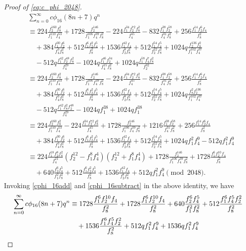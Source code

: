 \documentclass[12pt]{article}
\numberwithin{equation}{section}
\theoremstyle{plain}
\numberwithin{theorem}{section}
\theoremstyle{definition}
\theoremstyle{remark}
\begin{document}
\begin{proof}[Proof of \eqref{eq:c_phi_2048}]
\begin{align*}
			&\sum_{n=0}^{\infty}c\phi_{16}(8n+7)q^n\\&\equiv224\frac{f_2^{160}f_8^2}{f_1^{110} f_4^{53}}+1728\frac{f_2^{146}}{f_1^{106} f_4^{39} f_8^2}-224\frac{f_1^{34}f_2^{72} f_8^2 }{f_4^{45}}-832\frac{f_1^{38} f_2^{58}}{f_4^{31} f_8^2}+256\frac{f_1^{14} f_2^6 f_4}{f_8^2}\\&\quad+384\frac{f_1^{30} f_2^6}{f_4^3 f_8^2}+512\frac{f_1^6 f_2^2 f_4^5}{f_8^2}+1536\frac{f_1^{42} f_4}{f_2^8 f_8^2}+512\frac{f_1^{54} f_4^5}{f_2^{22} f_8^2}+1024q\frac{f_2^{136} f_8^2}{f_1^{102} f_4^{37}}\\&\quad-512q\frac{f_1^{42} f_2^{48} f_8^2}{f_4^{29}}-1024q\frac{f_1^{46} f_2^{34}}{f_4^{15} f_8^2}+1024q\frac{f_1^{58} f_4^7 f_8^2}{f_2^{32}}\\
            &\equiv224\frac{f_2^{160}f_8^2}{f_1^{110} f_4^{53}}+1728\frac{f_2^{146}}{f_1^{106} f_4^{39} f_8^2}-224\frac{f_1^{34} f_2^{72} f_8^2}{f_4^{45}}-832\frac{f_1^{38} f_2^{58}}{f_4^{31} f_8^2}+256\frac{f_1^{14} f_2^6 f_4}{f_8^2}\\&\quad+384\frac{f_1^{30} f_2^6}{f_4^3 f_8^2}+512\frac{f_1^6 f_2^2 f_4^5}{f_8^2}+1536\frac{f_1^{42} f_4}{f_2^8 f_8^2}+512\frac{f_1^{54} f_4^5}{f_2^{22} f_8^2}+1024q\frac{f_8^2 f_2^{136}}{f_1^{102} f_4^{37}}\\&\quad-512q\frac{f_1^{42} f_8^2 f_2^{48}}{f_4^{29}}-1024 q f_1^{38}+1024q f_1^{38}\\
            &\equiv224\frac{f_2^{160} f_8^2}{f_1^{110} f_4^{53}}-224\frac{f_1^{34} f_2^{72} f_8^2}{f_4^{45}}+1728\frac{f_2^{146}}{f_1^{106} f_4^{39} f_8^2}+1216\frac{f_1^{38} f_2^{58}}{f_4^{31} f_8^2}+256\frac{f_1^{14} f_2^6 f_4}{f_8^2}\\&\quad+384\frac{f_1^{30} f_2^6}{f_4^3 f_8^2}+512\frac{f_1^6 f_2^2 f_4^5}{f_8^2}+1536\frac{f_1^{42} f_4}{f_2^8 f_8^2}+512\frac{f_1^{54} f_4^5}{f_2^{22} f_8^2}+1024qf_1^2 f_4^{9}-512qf_1^2f_4^9\\
            &\equiv224\frac{ f_1^{18} f_2^8  f_8^2}{f_4^{21}}\left(f_2^{12}-f_1^8 f_4^4\right) \left(f_2^{12}+f_1^8 f_4^4\right)+1728\frac{ f_2^{146}}{f_1^{106} f_4^{39} f_8^2}+1728\frac{ f_1^6 f_2^{10} f_4}{f_8^2}\\&\quad+640\frac{ f_2^6 f_4^5}{f_1^2 f_8^2}+512\frac{ f_1^6  f_2^2f_4^5}{f_8^2}+1536\frac{ f_1^{42} f_4}{f_2^8 f_8^2}+512qf_1^2f_4^9\pmod{2048}.
	\end{align*}
    Invoking \eqref{cphi_16add} and \eqref{cphi_16subtract} in the above identity, we have
    \begin{align}
        \sum_{n=0}^{\infty}c\phi_{16}(8n+7)q^n 
        &\equiv1728\frac{ f_1^6 f_2^{10} f_4}{f_8^2}+1728\frac{ f_1^6 f_2^{10} f_4}{f_8^2}+640\frac{ f_2^6 f_4^5}{f_1^2 f_8^2}+512\frac{ f_1^6 f_4^5 f_2^2}{f_8^2}\notag\\&\quad+1536\frac{f_1^6 f_4^5 f_2^2}{f_8^2}+512qf_1^2f_4^9+1536qf_1^2f_4^{9} \nonumber \\

\end{align}
\end{proof}
\end{document}
